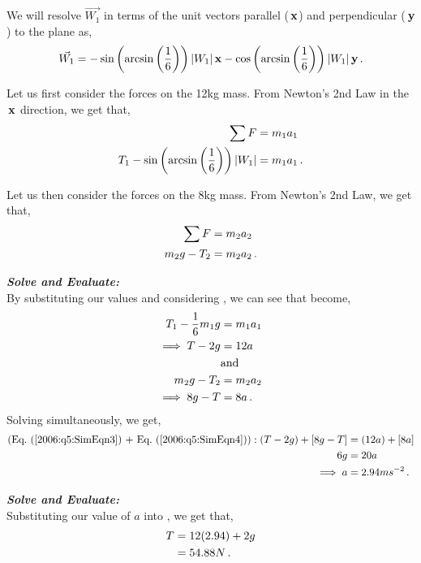 \begin{subquestions}
\begin{subsubquestions}
	We will resolve $\vec{W_1}$ in terms of the unit vectors parallel ($\,\mathbf{x}$) and perpendicular ($\,\mathbf{y}$) to the plane as,
	\begin{equation}
		\vec{W_1} = -\sin\left(\arcsin\left(\frac{1}{6}\right)\right)|W_1|\,\mathbf{x} - \cos\left(\arcsin\left(\frac{1}{6}\right)\right)|W_1|\,\mathbf{y} \,.
	\end{equation}
	
	Let us first consider the forces on the 12kg mass. From Newton's 2nd Law in the $\,\mathbf{x}$ direction, we get that,
	\begin{align}
		\sum F & = m_1a_1 \nonumber \\
		T_1 -\sin\left(\arcsin\left(\frac{1}{6}\right)\right)|W_1| & = m_1a_1 \label{2006:q5:SimEqn1} \,.
	\end{align}
	
	Let us then consider the forces on the 8kg mass. From Newton's 2nd Law, we get that,
	\begin{align}
		\sum F & = m_2a_2 \nonumber \\
		m_2g-T_2 & = m_2a_2 \label{2006:q5:SimEqn2} \,.
	\end{align}
	
	
	
	
	\textbf{\textit{Solve and Evaluate:}} \\
	By substituting our values and considering , we can see that  become,
	\begin{align}
		T_1 -\frac{1}{6}m_1g & = m_1a_1 \nonumber \\
		\implies T - 2g & = 12a \label{2006:q5:SimEqn3} \\
		& \text{and} \nonumber \\
		m_2g-T_2 & = m_2a_2 \nonumber \\
		\implies 8g-T & = 8a \label{2006:q5:SimEqn4} \,.
	\end{align}
	Solving  simultaneously, we get,
	\begin{align}
		(\text{\req{2006:q5:SimEqn3}~+~\req{2006:q5:SimEqn4}}): (T-2g)+[8g-T] & = (12a)+[8a] \nn \\
		6g & = 20a \nn \\
		\implies a & = 2.94ms^{-2}\,.
	\end{align} 
	
	
	\subsubquestion
	
	\textbf{\textit{Solve and Evaluate:}} \\
	Substituting our value of $a$ into , we get that,
	\begin{align}
		T & = 12(2.94) + 2g \nonumber \\
		  & = 54.88N \,.
	\end{align}
	

\end{subsubquestions}
\end{subquestions}
